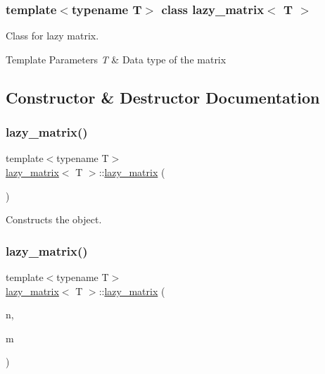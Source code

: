 \subsubsection*{template$<$typename T$>$\newline
class lazy\+\_\+matrix$<$ T $>$}

Class for lazy matrix. 


\begin{DoxyTemplParams}{Template Parameters}
{\em T} & Data type of the matrix \\
\hline
\end{DoxyTemplParams}


\subsection{Constructor \& Destructor Documentation}
\mbox{\label{classlazy__matrix_aef0a15c588094c4dadf2bd879be78d43}} 
\subsubsection{\texorpdfstring{lazy\_matrix()}{lazy\_matrix()}\hspace{0.1cm}{\footnotesize\ttfamily [1/6]}}
{\footnotesize\ttfamily template$<$typename T$>$ \\
\mbox{\hyperlink{classlazy__matrix}{lazy\+\_\+matrix}}$<$ T $>$\+::\mbox{\hyperlink{classlazy__matrix}{lazy\+\_\+matrix}} (\begin{DoxyParamCaption}{ }\end{DoxyParamCaption})\hspace{0.3cm}{\ttfamily [inline]}}



Constructs the object. 

\mbox{\label{classlazy__matrix_a354b6e228f5bc0991f759161e081f008}} 
\subsubsection{\texorpdfstring{lazy\_matrix()}{lazy\_matrix()}\hspace{0.1cm}{\footnotesize\ttfamily [2/6]}}
{\footnotesize\ttfamily template$<$typename T$>$ \\
\mbox{\hyperlink{classlazy__matrix}{lazy\+\_\+matrix}}$<$ T $>$\+::\mbox{\hyperlink{classlazy__matrix}{lazy\+\_\+matrix}} (\begin{DoxyParamCaption}\item[{const std\+::size\+\_\+t \&}]{n,  }\item[{const std\+::size\+\_\+t \&}]{m }\end{DoxyParamCaption})\hspace{0.3cm}{\ttfamily [inline]}}



